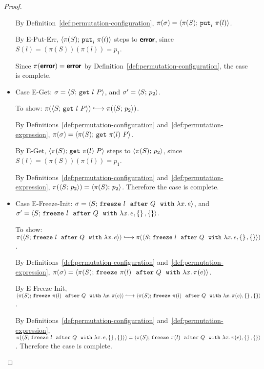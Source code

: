 \begin{proof}
\begin{itemize}
      By Definition~\ref{def:permutation-configuration}, $\pi(\sigma) =
      \langle \pi(S);\, \mbox{\texttt{put}}_i~\pi(l) \rangle$.

      By {\sc E-Put-Err}, $\langle \pi(S);\, \mbox{\texttt{put}}_i~\pi(l) \rangle$ steps to
      $\textbf{\textsf{error}}$, since $S(l) = (\pi(S))(\pi(l)) = p_1$.

      Since $\pi(\textbf{\textsf{error}}) = \textbf{\textsf{error}}$ by
      Definition~\ref{def:permutation-configuration}, the case is
      complete.
    \item Case {\sc E-Get}: $\sigma = \langle S;\, \mbox{\texttt{get}}~l~P \rangle$, and
      $\sigma' = \langle S;\, p_2 \rangle$.

      To show: $\pi(\config{S}{\getexp{l}{P}}) \parstepsto
      \pi(\config{S}{p_2})$.

      By Definitions~\ref{def:permutation-configuration}
      and~\ref{def:permutation-expression}, $\pi(\sigma) =
      \langle \pi(S);\, \mbox{\texttt{get}}~\pi(l)~P \rangle$.

      By {\sc E-Get}, $\langle \pi(S);\, \mbox{\texttt{get}}~\pi(l)~P \rangle$ steps to
      $\langle \pi(S);\, p_2 \rangle$, since $S(l) = (\pi(S))(\pi(l)) = p_1$.

      By Definitions~\ref{def:permutation-configuration}
      and~\ref{def:permutation-expression}, $\pi(\langle S;\, p_2 \rangle) =
      \langle \pi(S);\, p_2 \rangle$.  Therefore the case is complete.
    \item Case {\sc E-Freeze-Init}: $\sigma =
      \langle S;\, \mbox{\texttt{freeze}}~l~~{\mbox{\texttt{after}}}~Q~~{\mbox{\texttt{with}}}~\lambda x.\,e \rangle$, and $\sigma' =
      \langle S;\, \mbox{\texttt{freeze}}~l~~{\mbox{\texttt{after}}}~Q~~{\mbox{\texttt{with}}}~\lambda x.\,e, \left\{\right\}, \left\{\right\} \rangle$.

      To show: $\pi(\config{S}{\freezeafter{l}{Q}{\lam{x}{e}}})
      \parstepsto
      \pi(\config{S}{\freezeafterfull{l}{Q}{\lam{x}{e}}{\setof{}}{\setof{}}})$.

      By Definitions~\ref{def:permutation-configuration}
      and~\ref{def:permutation-expression}, $\pi(\sigma) =
      \langle \pi(S);\, \mbox{\texttt{freeze}}~\pi(l)~~{\mbox{\texttt{after}}}~Q~~{\mbox{\texttt{with}}}~\lambda x.\,\pi(e) \rangle$.

      By {\sc E-Freeze-Init},
      $\config{\pi(S)}{\freezeafter{\pi(l)}{Q}{\lam{x}{\pi(e)}}}
      \parstepsto
      \config{\pi(S)}{\freezeafterfull{\pi(l)}{Q}{\lam{x}{\pi(e)}}{\setof{}}{\setof{}}}$.

      By Definitions~\ref{def:permutation-configuration}
      and~\ref{def:permutation-expression},
      $\pi(\langle S;\, \mbox{\texttt{freeze}}~l~~{\mbox{\texttt{after}}}~Q~~{\mbox{\texttt{with}}}~\lambda x.\,e, \left\{\right\}, \left\{\right\} \rangle)
      =
      \langle \pi(S);\, \mbox{\texttt{freeze}}~\pi(l)~~{\mbox{\texttt{after}}}~Q~~{\mbox{\texttt{with}}}~\lambda x.\,\pi(e), \left\{\right\}, \left\{\right\} \rangle$.
      Therefore the case is complete.


\end{itemize}
\end{proof}
